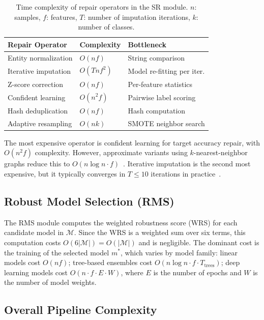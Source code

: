 \documentclass[runningheads]{llncs}
\begin{document}
\begin{table}[t]
\centering
\caption{Time complexity of repair operators in the SR module.
$n$: samples, $f$: features, $T$: number of imputation iterations,
$k$: number of classes.}
\label{tab:complexity}
\small
\begin{tabular}{@{}llp{3.5cm}@{}}
\toprule
\textbf{Repair Operator} & \textbf{Complexity} & \textbf{Bottleneck} \\
\midrule
Entity normalization   & $O(nf)$           & String comparison \\
Iterative imputation   & $O(Tnf^2)$        & Model re-fitting per iter. \\
Z-score correction     & $O(nf)$           & Per-feature statistics \\
Confident learning     & $O(n^2 f)$        & Pairwise label scoring \\
Hash deduplication     & $O(nf)$           & Hash computation \\
Adaptive resampling    & $O(nk)$           & SMOTE neighbor search \\
\bottomrule
\end{tabular}
\end{table}

The most expensive operator is confident learning for target
accuracy repair, with $O(n^2 f)$ complexity.
However, approximate variants using $k$-nearest-neighbor graphs
reduce this to $O(n \log n \cdot f)$~\cite{northcutt2021}.
Iterative imputation is the second most expensive, but it
typically converges in $T \leq 10$ iterations in practice~\cite{stekhoven2012}.

\subsection{Robust Model Selection (RMS)}

The RMS module computes the weighted robustness score (WRS) for
each candidate model in $\mathcal{M}$.
Since the WRS is a weighted sum over six terms, this computation
costs $O(6 |\mathcal{M}|) = O(|\mathcal{M}|)$ and is negligible.
The dominant cost is the training of the selected model $m^*$,
which varies by model family:
linear models cost $O(nf)$;
tree-based ensembles cost $O(n \log n \cdot f \cdot T_{\text{trees}})$;
deep learning models cost $O(n \cdot f \cdot E \cdot W)$,
where $E$ is the number of epochs and $W$ is the number of
model weights.

\subsection{Overall Pipeline Complexity}
\end{document}

